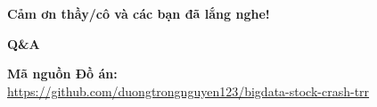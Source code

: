 \documentclass[aspectratio=169, 10pt]{beamer}
\begin{document}
\begin{frame}[plain]
    \centering
    \vspace{2cm}
    \Huge \textbf{\textcolor{mygreen}{Cảm ơn thầy/cô và các bạn đã lắng nghe!}}
    
    \vspace{1.5cm}
    \Large \textbf{Q\&A}
    
    \vspace{1.5cm}
    \normalsize \textbf{Mã nguồn Đồ án:} \\
    \url{https://github.com/duongtrongnguyen123/bigdata-stock-crash-trr}
\end{frame}
\end{document}
